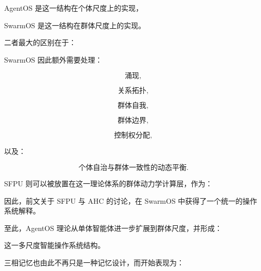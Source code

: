 \begin{statementbox}
\centering
{}
\end{statementbox}

AgentOS 是这一结构在个体尺度上的实现，

SwarmOS 是这一结构在群体尺度上的实现。

二者最大的区别在于：

\begin{statementbox}
\centering
{}
\end{statementbox}

SwarmOS 因此额外需要处理：

\[
\text{涌现},
\]

\[
\text{关系拓扑},
\]

\[
\text{群体自我},
\]

\[
\text{群体边界},
\]

\[
\text{控制权分配},
\]

以及：

\[
\text{个体自治与群体一致性的动态平衡}.
\]

SFPU 则可以被放置在这一理论体系的群体动力学计算层，作为：

\begin{statementbox}
\centering
{}
\end{statementbox}

因此，前文关于 SFPU 与 AHC 的讨论，在 SwarmOS 中获得了一个统一的操作系统解释。

至此，AgentOS 理论从单体智能体进一步扩展到群体尺度，并形成：

\begin{statementbox}
\centering
{}
\end{statementbox}

这一多尺度智能操作系统结构。

三相记忆也由此不再只是一种记忆设计，而开始表现为：

\begin{statementbox}
\centering
{}
\end{statementbox}